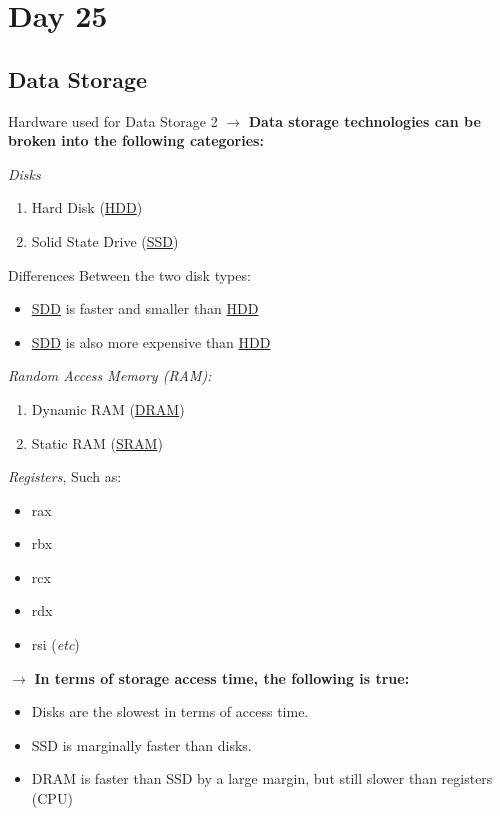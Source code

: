 \documentclass{report}
\begin{document}
\chapter{Day 25}
\section{Data Storage}
  \begin{example} {Hardware used for Data Storage} { 2 }
    $\to$ \textbf{Data storage technologies can be broken into the following categories:} \\
    \par \emph {Disks}
    \begin{enumerate}
      \item Hard Disk (\underline{HDD})
    \item Solid State Drive (\underline{SSD})   \\
    \end{enumerate}
    \par
    Differences Between the two disk types: \\
    \begin{itemize}
      \item \underline{SDD} is faster and smaller than \underline{HDD}
      \item \underline{SDD} is also more expensive than \underline{HDD} \\
    \end{itemize}
    \par
    \emph{Random Access Memory (RAM): }\\
    \begin{enumerate}
      \item Dynamic RAM (\underline{DRAM})
      \item Static RAM (\underline{SRAM}) \\
    \end{enumerate}
    \par
    \emph {Registers}, Such as:
    \begin{itemize}
      \item rax
      \item rbx
      \item rcx
      \item rdx
      \item rsi (\emph{etc})
    \end{itemize}
  \end{example} 

\newpage
$\to$ \textbf{In terms of storage access time, the following is true:} 
\begin{itemize}
  \item Disks are the slowest in terms of access time. 
  \item SSD is marginally faster than disks. 
  \item DRAM is faster than SSD by a large margin, but still slower than registers (CPU) 
\end{itemize}
\end{document}
